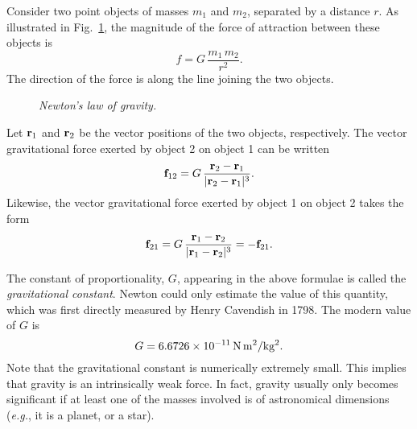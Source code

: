  Consider two point
objects of masses $m_1$ and $m_2$, separated by a distance $r$.
As illustrated in Fig.~\ref{f105}, the magnitude of the force of attraction
between these objects  is 
\begin{equation}
f = G\,\frac{m_1\,m_2}{r^2}.
\end{equation}
The direction of the force is along the line joining the two objects.

\begin{figure}
\epsfysize=2in
\centerline{}
\caption{\em Newton's law of gravity.}\label{f105}  
\end{figure}

Let ${\bf r}_1$ and ${\bf r}_2$ be the vector positions of the two objects,
respectively. The vector gravitational force exerted by object 2 on object 1 can
be written
\begin{equation}
{\bf f}_{12} = G\,\frac{{\bf r}_2-{\bf r}_1}{|{\bf r}_2-{\bf r}_1|^3}.
\end{equation}
Likewise, the vector gravitational force exerted by object 1 on object 2 takes
the form
\begin{equation}
{\bf f}_{21} = G\,\frac{{\bf r}_1-{\bf r}_2}{|{\bf r}_1-{\bf r}_2|^3} = - {\bf f}_{21}.
\end{equation}

The constant of proportionality, $G$, appearing in the above formulae is called the
{\em gravitational constant}. Newton could only estimate the value of this quantity, which was first
directly measured by Henry Cavendish in 1798. The modern value of $G$ is
\begin{equation}
G = 6.6726\times 10^{-11}\,{\rm N\,m^2/ kg^2}.
\end{equation}
Note that the gravitational constant is numerically extremely small. This implies that gravity is
an intrinsically weak force. In fact, gravity usually  only becomes  significant  if at least
one of the masses involved is of astronomical dimensions ({\em e.g.}, it is a planet, or
a star).

